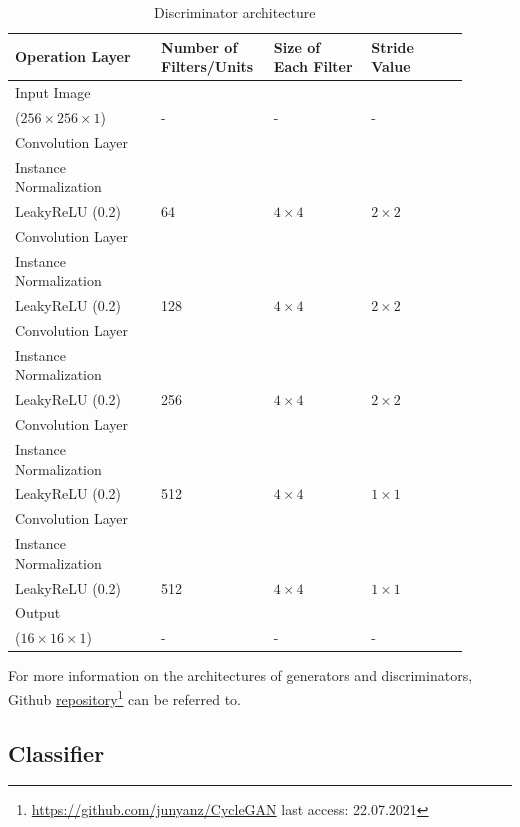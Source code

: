 \begin{table}[H]
    \centering

    \begin{tabular}{P{0.30\linewidth} P{0.20\linewidth} P{0.20\linewidth} P{0.20\linewidth}} 
        \toprule
        \textbf{Operation Layer} & \textbf{Number of Filters/Units}  & \textbf{Size of Each Filter} & \textbf{Stride Value}\\
        \toprule
        \toprule
        Input Image \\($256 \times 256 \times 1$) & - & - & -\\
        \midrule
        Convolution Layer\\Instance Normalization\\LeakyReLU (0.2) & 64 & $4 \times 4$ & $2 \times 2$\\
        \midrule
        Convolution Layer\\Instance Normalization\\LeakyReLU (0.2) & 128 & $4 \times 4$ & $2 \times 2$\\
        \midrule
        Convolution Layer\\Instance Normalization\\LeakyReLU (0.2) & 256 & $4 \times 4$ & $2 \times 2$\\
        \midrule
        Convolution Layer\\Instance Normalization\\LeakyReLU (0.2) & 512 & $4 \times 4$ & $1 \times 1$\\
        \midrule
        Convolution Layer\\Instance Normalization\\LeakyReLU (0.2) & 512 & $4 \times 4$ & $1 \times 1$\\
        \midrule
        \midrule
        Output  \\($16 \times 16 \times 1$) & - & - & -\\
        \bottomrule
    \end{tabular}
    \caption[Discriminator architecture]{Discriminator architecture}
    \label{table:DiscriminatorArchitecture}
\end{table}

For more information on the architectures of generators and discriminators, Github \href{https://github.com/junyanz/CycleGAN}{repository}\footnote{\url{https://github.com/junyanz/CycleGAN} last access: 22.07.2021} can be referred to. 



\subsection{Classifier}

